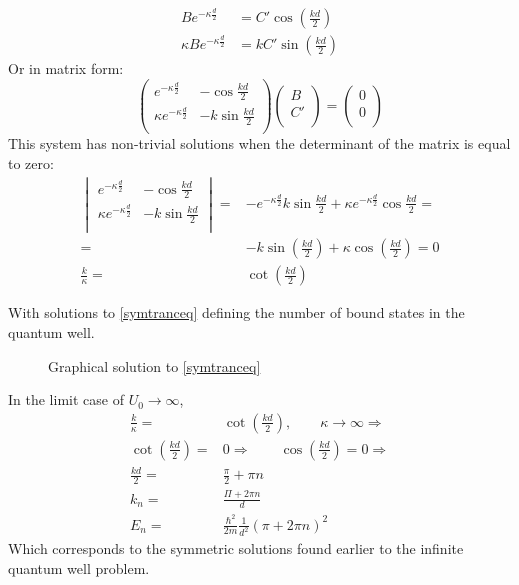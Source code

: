 		\begin{align}
			Be^{-\kappa \frac{d}{2}} &= C' \cos(\frac{kd}{2}) \\
			\kappa Be^{-\kappa \frac{d}{2}} &= kC' \sin(\frac{kd}{2})			
		\end{align}
		Or in matrix form:
		\begin{equation}
		\begin{pmatrix}
		e^{-\kappa \frac{d}{2}}			&	-\cos{\frac{kd}{2}}	\\ 
		\kappa e^{-\kappa \frac{d}{2}}	&	-k\sin{\frac{kd}{2}}	\\
		\end{pmatrix}
		\begin{pmatrix}
		B \\
		C' \\
		\end{pmatrix}
		=
		\begin{pmatrix}
		0 \\
		0 \\
		\end{pmatrix}			
		\end{equation}
		This system has non-trivial solutions when the determinant of the matrix is equal to zero:
		\begin{align}
			\begin{vmatrix}
				e^{-\kappa \frac{d}{2}}			&	-\cos{\frac{kd}{2}}	\\ 
				\kappa e^{-\kappa \frac{d}{2}}	&	-k\sin{\frac{kd}{2}}	\\
			\end{vmatrix}
			=& -e^{-\kappa\frac{d}{2}} k\sin{\frac{kd}{2}} + \kappa e^{-\kappa \frac{d}{2}} \cos{\frac{kd}{2}} =\\
			=& -k\sin(\frac{kd}{2}) + \kappa\cos(\frac{kd}{2}) = 0 \\
			\frac{k}{\kappa} =& \cot(\frac{kd}{2}) \label{symtranceq}
		\end{align}
		
		With solutions to \ref{symtranceq} defining the number of bound states in the quantum well. 
		\begin{figure}[!h]
			\centering
			
			\caption{Graphical solution to \ref{symtranceq}}
		\end{figure}
		
		In the limit case of $U_0 \rightarrow \infty$,
		\begin{align}
			\frac{k}{\kappa} =& \cot(\frac{kd}{2}),\qquad \kappa \rightarrow \infty \Rightarrow \\
			\cot(\frac{kd}{2}) =& 0 \Rightarrow\qquad	\cos(\frac{kd}{2}) = 0 \Rightarrow\\
			\frac{kd}{2} =& \frac{\pi}{2} + \pi n \\
			k_n =& \frac{\Pi + 2\pi n}{d} \\
			E_n =& \frac{\hbar^2}{2m}\frac{1}{d^2}\left(\pi + 2\pi n\right)^2
		\end{align}
		Which corresponds to the symmetric solutions found earlier to the infinite quantum well problem.
		
